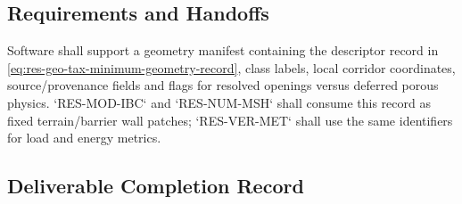 \subsection{Requirements and Handoffs}
\label{sec:res-geo-tax-requirements}

Software shall support a geometry manifest containing the descriptor
record in \cref{eq:res-geo-tax-minimum-geometry-record}, class labels,
local corridor coordinates, source/provenance fields and flags for
resolved openings versus deferred porous physics. `RES-MOD-IBC` and
`RES-NUM-MSH` shall consume this record as fixed terrain/barrier wall
patches; `RES-VER-MET` shall use the same identifiers for load and
energy metrics.

\subsection{Deliverable Completion Record}
\label{sec:res-geo-tax-completion-record}

%
%
%
